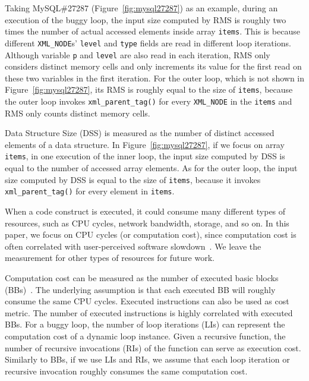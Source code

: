 Taking MySQL\#27287 (Figure~\ref{fig:mysql27287}) as an example, 
during an execution of the buggy loop, the input size
computed by RMS is roughly 
two times the number of actual accessed elements inside array \texttt{items}. 
This is because different \texttt{XML\_NODE}s' \texttt{level} and \texttt{type} 
fields are read in different loop iterations. 
Although variable \texttt{p} and \texttt{level} are also read in each iteration,
RMS only considers distinct memory cells and 
only increments its value for the first read on these 
two variables in the first iteration. 
For the outer loop, which is not shown in Figure~\ref{fig:mysql27287}, 
its RMS is roughly equal to the size of \texttt{items}, 
because the outer loop invokes \texttt{xml\_parent\_tag()} for every
\texttt{XML\_NODE} in the \texttt{items} and RMS only 
counts distinct memory cells. 


Data Structure Size (DSS) is measured as
the number of distinct accessed elements of a data structure.  
%
In Figure~\ref{fig:mysql27287}, if we focus on array \texttt{items},
in one execution of the inner loop, the input size computed by DSS 
is equal to the number of accessed array elements. 
As for the outer loop, the input size computed by DSS  is
equal to the size of  \texttt{items}, because
it invokes \texttt{xml\_parent\_tag()} for every element in \texttt{items}.


When a code construct is executed,
it could consume many different types of resources, 
such as CPU cycles, network bandwidth, storage, and so on.
In this paper, we focus on CPU cycles (or computation cost), 
since computation cost is often correlated 
with user-perceived software slowdown~\cite{SongOOPSLA2014}.
We leave the measurement for other types of 
resources for future work.


Computation cost can be measured 
as the number of executed basic blocks (BBs)~\cite{Aprof1,Aprof2}.
The underlying assumption is that each executed 
BB will roughly consume the same CPU cycles. 
Executed instructions can also be used as cost metric. 
The number of executed instructions is highly correlated with executed BBs.
For a buggy loop, the number of loop iterations (LIs) can represent 
the computation cost of a dynamic loop instance.
Given a recursive function, the number of recursive invocations (RIs) 
of the function can serve as execution cost.
Similarly to BBs, if we use LIs and RIs, 
we assume that each loop iteration or recursive invocation 
roughly consumes the same computation cost. 



